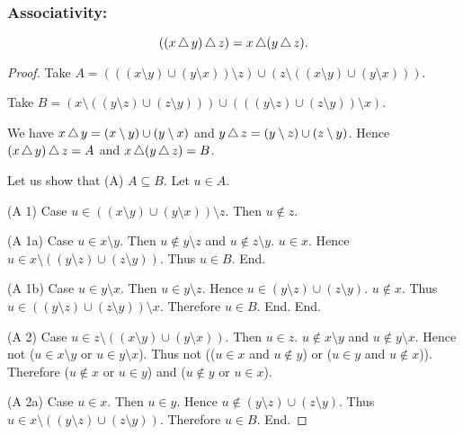 \documentclass[../../set-theory.ftl.tex]{subfiles}
\begin{document}
  \subsubsection*{Associativity:}

  \begin{forthel}
    \begin{proposition}\label{SetTheory_01_04_606646}
      \[ ((x \mathop{\triangle} y) \mathop{\triangle} z) = x \mathop{\triangle} (y \mathop{\triangle} z). \]
    \end{proposition}
    \begin{proof}
      Take $A = (((x \setminus y) \cup (y \setminus x)) \setminus z) \cup (z \setminus ((x \setminus y) \cup (y \setminus x)))$.

      Take $B = (x \setminus ((y \setminus z) \cup (z \setminus y))) \cup (((y \setminus z) \cup (z \setminus y)) \setminus x)$.

      We have $x \mathop{\triangle} y = (x \setminus y) \cup (y \setminus x)$ and $y \mathop{\triangle} z = (y \setminus z) \cup (z \setminus y)$.
      Hence $(x \mathop{\triangle} y) \mathop{\triangle} z = A$ and $x \mathop{\triangle} (y \mathop{\triangle} z) = B$.

      Let us show that (A) $A \subseteq B$.
        Let $u \in A$.

        (A 1) Case $u \in ((x \setminus y) \cup (y \setminus x)) \setminus z$.
          Then $u \notin z$.

          (A 1a) Case $u \in x \setminus y$.
            Then $u \notin y \setminus z$ and $u \notin z \setminus y$.
            $u \in x$.
            Hence $u \in x \setminus ((y \setminus z) \cup (z \setminus y))$.
            Thus $u \in B$.
          End.

          (A 1b) Case $u \in y \setminus x$.
            Then $u \in y \setminus z$.
            Hence $u \in (y \setminus z) \cup (z \setminus y)$.
            $u \notin x$.
            Thus $u \in ((y \setminus z) \cup (z \setminus y)) \setminus x$.
            Therefore $u \in B$.
          End.
        End.

        (A 2) Case $u \in z \setminus ((x \setminus y) \cup (y \setminus x))$.
          Then $u \in z$.
          $u \notin x \setminus y$ and $u \notin y \setminus x$.
          Hence not ($u \in x \setminus y$ or $u \in y \setminus x$).
          Thus not (($u \in x$ and $u \notin y$) or ($u \in y$ and
          $u \notin x$)).
          Therefore ($u \notin x$ or $u \in y$) and ($u \notin y$ or $u \in x$).

          (A 2a) Case $u \in x$.
            Then $u \in y$.
            Hence $u \notin (y \setminus z) \cup (z \setminus y)$.
            Thus $u \in x \setminus ((y \setminus z) \cup (z \setminus y))$.
            Therefore $u \in B$.
          End.


\end{proof}
\end{forthel}
\end{document}

